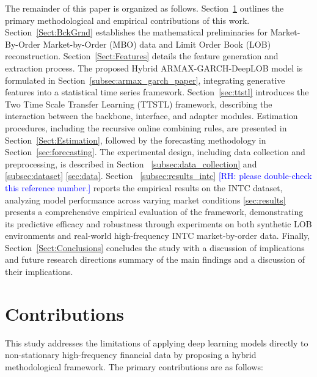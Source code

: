 \documentclass[10pt,a4paper,oneside]{article}
\newcommand{\rh}[1]{\textcolor{blue}{\textsf{[RH: #1]}}}
\providecommand{\DIFaddtex}[1]{{\protect\color{blue} \sf #1}} %
\providecommand{\DIFdeltex}[1]{{\protect\color{red} \scriptsize #1}} %
\providecommand{\DIFaddbegin}{} %
\providecommand{\DIFaddend}{} %
\providecommand{\DIFdelbegin}{} %
\providecommand{\DIFdelend}{} %
\providecommand{\DIFadd}[1]{\texorpdfstring{\DIFaddtex{#1}}{#1}} %
\providecommand{\DIFdel}[1]{\texorpdfstring{\DIFdeltex{#1}}{}} %
\newcommand{\DIFscaledelfig}{0.5}
\newlength{\DIFdelgraphicswidth} %
\newlength{\DIFdelgraphicsheight} %
\newcommand{\DIFaddincludegraphics}[2][]{{\color{blue}\fbox{\DIFOincludegraphics[#1]{#2}}}} %
\newcommand{\DIFdelincludegraphics}[2][]{%
\sbox{\DIFdelgraphicsbox}{\DIFOincludegraphics[#1]{#2}}%
\settoboxwidth{\DIFdelgraphicswidth}{\DIFdelgraphicsbox} %
\settoboxtotalheight{\DIFdelgraphicsheight}{\DIFdelgraphicsbox} %
\scalebox{\DIFscaledelfig}{%
\parbox[b]{\DIFdelgraphicswidth}{\usebox{\DIFdelgraphicsbox}\\[-\baselineskip] \rule{\DIFdelgraphicswidth}{0em}}\llap{\resizebox{\DIFdelgraphicswidth}{\DIFdelgraphicsheight}{%
\setlength{\unitlength}{\DIFdelgraphicswidth}%
\begin{picture}(1,1)%
\thicklines\linethickness{2pt} %
{\color[rgb]{1,0,0}\put(0,0){\framebox(1,1){}}}%
{\color[rgb]{1,0,0}\put(0,0){\line( 1,1){1}}}%
{\color[rgb]{1,0,0}\put(0,1){\line(1,-1){1}}}%
\end{picture}%
}\hspace*{3pt}}} %
} %
\DeclareRobustCommand{\DIFaddbegin}{\DIFOaddbegin \let\includegraphics\DIFaddincludegraphics} %
\DeclareRobustCommand{\DIFaddend}{\DIFOaddend \let\includegraphics\DIFOincludegraphics} %
\DeclareRobustCommand{\DIFdelbegin}{\DIFOdelbegin \let\includegraphics\DIFdelincludegraphics} %
\DeclareRobustCommand{\DIFdelend}{\DIFOaddend \let\includegraphics\DIFOincludegraphics} %
\begin{document}
The remainder of this paper is organized as follows. Section~\ref{Sect:Contributions} outlines the primary methodological and empirical contributions of this work. Section~\ref{Sect:BckGrnd} establishes the mathematical preliminaries for \DIFdelbegin \DIFdel{Market-By-Order }\DIFdelend \DIFaddbegin \DIFadd{Market-by-Order }\DIFaddend (MBO) data and Limit Order Book (LOB) reconstruction. Section~\ref{Sect:Features} details the feature generation and extraction process. The proposed Hybrid ARMAX-GARCH-DeepLOB model is formulated in Section~\ref{subsec:armax_garch_paper}, integrating generative features into a statistical time series framework. Section~\ref{sec:ttstl} introduces the Two Time Scale Transfer Learning (TTSTL) framework, describing the interaction between the backbone, interface, and adapter modules. Estimation procedures, including the recursive online combining rules, are presented in Section~\ref{Sect:Estimation}, followed by the forecasting methodology in Section~\ref{sec:forecasting}. The experimental design, including data collection and preprocessing, is described in Section~\DIFdelbegin \DIFdel{\ref{subsec:data_collection} and \ref{subsec:dataset}}\DIFdelend \DIFaddbegin \DIFadd{\ref{sec:data}}\DIFaddend . Section~\DIFdelbegin \DIFdel{\ref{subsec:results_intc} \rh{please double-check this reference number.} reports the empirical results on the INTC dataset, analyzing model performance across varying market conditions}\DIFdelend \DIFaddbegin \DIFadd{\ref{sec:results} presents a comprehensive empirical evaluation of the framework, demonstrating its predictive efficacy and robustness through experiments on both synthetic LOB environments and real-world high-frequency INTC market-by-order data}\DIFaddend . Finally, Section~\ref{Sect:Conclusions} concludes the study with a \DIFdelbegin \DIFdel{discussion of implications and future research directions}\DIFdelend \DIFaddbegin \DIFadd{summary of the main findings and a discussion of their implications}\DIFaddend .

\section{Contributions}
\label{Sect:Contributions}

This study addresses the limitations of applying deep learning models directly to non-stationary high-frequency financial data by proposing a hybrid methodological framework. The primary contributions are as follows:
\end{document}
